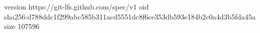 version https://git-lfs.github.com/spec/v1
oid sha256:d788ddc1f299abc585b311acd5551dc8f6ce353db593e184b2c0a4d3b5fda45a
size 107596
